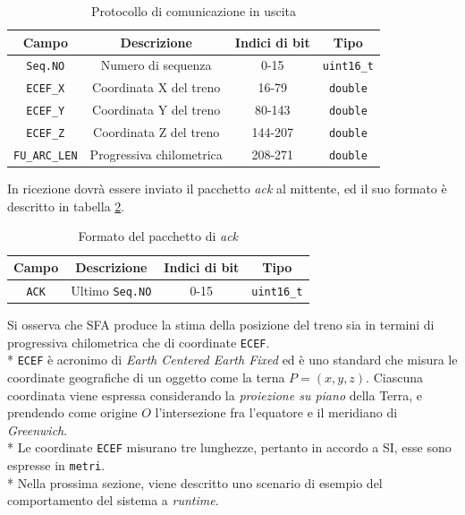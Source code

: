 \begin{table}[h]
	\centering
	\begin{tabular}{|c|c|c|c|}
		\hline 
		\textbf{Campo} & \textbf{Descrizione} & \textbf{Indici di bit} & \textbf{Tipo} \\ 
		\hline
		\texttt{Seq.NO} & Numero di sequenza & 0-15 & \texttt{uint16\_t} \\ 
		\hline 
		\texttt{ECEF\_X} & Coordinata X del treno & 16-79 & \texttt{double} \\ 
		\hline 
		\texttt{ECEF\_Y} & Coordinata Y del treno & 80-143 & \texttt{double} \\ 
		\hline 
		\texttt{ECEF\_Z} & Coordinata Z del treno & 144-207 & \texttt{double} \\ 
		\hline 
		\texttt{FU\_ARC\_LEN} & Progressiva chilometrica & 208-271 & \texttt{double} \\ 
		\hline 
	\end{tabular} 
\caption{Protocollo di comunicazione in uscita}
\label{tab:protoout}
\end{table}
In ricezione dovr\`a essere inviato il pacchetto \emph{ack} al mittente, ed il suo formato \`e descritto in tabella \ref{tab:ack}.
\begin{table}[h]
	\centering
	\begin{tabular}{|c|c|c|c|}
	\hline 
	\textbf{Campo} & \textbf{Descrizione} & \textbf{Indici di bit} & \textbf{Tipo} \\ 
	\hline
	\texttt{ACK} & Ultimo \texttt{Seq.NO} & 0-15 & \texttt{uint16\_t} \\ 
	\hline
\end{tabular}
\caption{Formato del pacchetto di \emph{ack}}
\label{tab:ack}
\end{table}
Si osserva che SFA produce la stima della posizione del treno sia in termini di progressiva chilometrica che di coordinate \texttt{ECEF}.\\*
\texttt{ECEF} \`e acronimo di \emph{Earth Centered Earth Fixed} ed \`e uno standard che misura le coordinate geografiche di un oggetto come la terna $ P = (x,y,z)$. Ciascuna coordinata viene espressa considerando la \emph{proiezione su piano} della Terra, e prendendo come origine $O$ l'intersezione fra l'equatore e il meridiano di \emph{Greenwich}.\\*
Le coordinate \texttt{ECEF} misurano tre lunghezze, pertanto in accordo a SI, esse sono espresse in \texttt{metri}.\\*
Nella prossima sezione, viene descritto uno scenario di esempio del comportamento del sistema a \emph{runtime}.

